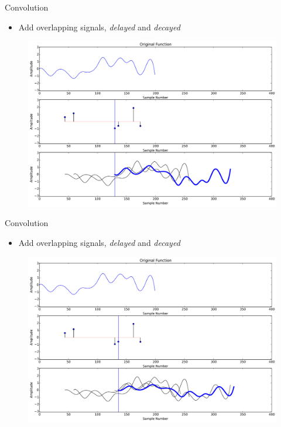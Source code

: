 \documentclass{beamer}
\begin{document}
\begin{frame}{Convolution}

\begin{itemize}[label=$\vartriangleright$]
\item Add overlapping signals, {\em delayed} and {\em decayed}
\end{itemize}

\begin{figure}[t]
	\centering
    \includegraphics[width=\textwidth]{Conv2.pdf}
\end{figure}


\end{frame}



\begin{frame}{Convolution}

\begin{itemize}[label=$\vartriangleright$]
\item Add overlapping signals, {\em delayed} and {\em decayed}
\end{itemize}

\begin{figure}[t]
	\centering
    \includegraphics[width=\textwidth]{Conv3.pdf}
\end{figure}


\end{frame}
\end{document}
